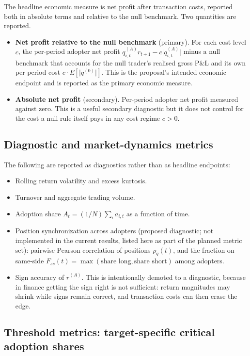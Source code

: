 \documentclass[11pt]{article}
\begin{document}
The headline economic measure is net profit after transaction costs, reported both in absolute terms and relative to the null benchmark. Two quantities are reported.

\begin{itemize}[itemsep=0.2em]
  \item \textbf{Net profit relative to the null benchmark} (primary). For each cost level $c$, the per-period adopter net profit $q_{i,t}^{(A)} r_{t+1} - c \lvert q_{i,t}^{(A)} \rvert$ minus a null benchmark that accounts for the null trader's realised gross P\&L and its own per-period cost $c \cdot E[\lvert q^{(0)} \rvert]$. This is the proposal's intended economic endpoint and is reported as the primary economic measure.
  \item \textbf{Absolute net profit} (secondary). Per-period adopter net profit measured against zero. This is a useful secondary diagnostic but it does not control for the cost a null rule itself pays in any cost regime $c > 0$.
\end{itemize}

\subsection{Diagnostic and market-dynamics metrics}

The following are reported as diagnostics rather than as headline endpoints:

\begin{itemize}[itemsep=0.2em]
  \item Rolling return volatility and excess kurtosis.
  \item Turnover and aggregate trading volume.
  \item Adoption share $A_t = (1/N) \sum_i a_{i,t}$ as a function of time.
  \item Position synchronization across adopters (proposed diagnostic; not implemented in the current results, listed here as part of the planned metric set): pairwise Pearson correlation of positions $\rho_q(t)$, and the fraction-on-same-side $F_{ss}(t) = \max(\text{share long}, \text{share short})$ among adopters.
  \item Sign accuracy of $\hat{r}^{(A)}$. This is intentionally demoted to a diagnostic, because in finance getting the sign right is not sufficient: return magnitudes may shrink while signs remain correct, and transaction costs can then erase the edge.
\end{itemize}

\subsection{Threshold metrics: target-specific critical adoption shares}
\end{document}
